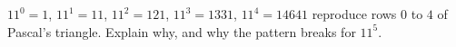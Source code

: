 $11^0=1$, $11^1=11$, $11^2=121$, $11^3=1331$, $11^4=14641$ reproduce rows $0$ to $4$ of Pascal's triangle. Explain why, and why the pattern breaks for $11^5$.
